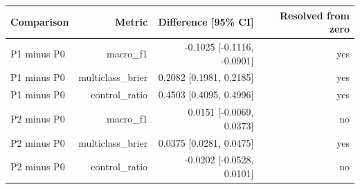 \begin{tabular}{lrrr}
\hline
Comparison & Metric & Difference [95\% CI] & Resolved from zero \\
\hline
P1 minus P0 & macro\_f1 & -0.1025 [-0.1116, -0.0901] & yes \\
P1 minus P0 & multiclass\_brier & 0.2082 [0.1981, 0.2185] & yes \\
P1 minus P0 & control\_ratio & 0.4503 [0.4095, 0.4996] & yes \\
P2 minus P0 & macro\_f1 & 0.0151 [-0.0069, 0.0373] & no \\
P2 minus P0 & multiclass\_brier & 0.0375 [0.0281, 0.0475] & yes \\
P2 minus P0 & control\_ratio & -0.0202 [-0.0528, 0.0101] & no \\
\hline
\end{tabular}
